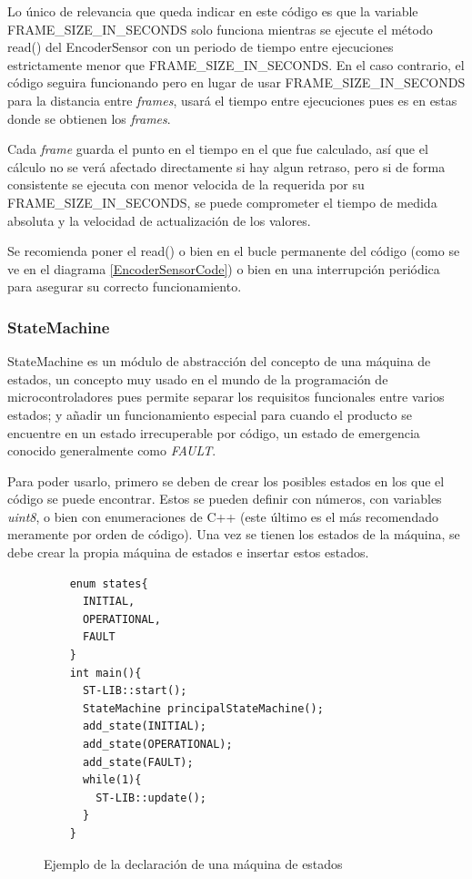 \documentclass{report}
\begin{document}
\par \vspace{0.3cm}
Lo único de relevancia que queda indicar en este código es que la variable FRAME\_SIZE\_IN\_SECONDS solo funciona mientras se ejecute el método read() del EncoderSensor con un periodo de tiempo entre ejecuciones estrictamente menor que FRAME\_SIZE\_IN\_SECONDS. En el caso contrario, el código seguira funcionando pero en lugar de usar FRAME\_SIZE\_IN\_SECONDS para la distancia entre \textit{frames}, usará el tiempo entre ejecuciones pues es en estas donde se obtienen los \textit{frames}. \par
Cada \textit{frame} guarda el punto en el tiempo en el que fue calculado, así que el cálculo no se verá afectado directamente si hay algun retraso, pero si de forma consistente se ejecuta con menor velocida de la requerida por su FRAME\_SIZE\_IN\_SECONDS, se puede comprometer el tiempo de medida absoluta y la velocidad de actualización de los valores. \par \vspace{0.3cm}
Se recomienda poner el read() o bien en el bucle permanente del código (como se ve en el diagrama \ref{EncoderSensorCode}) o bien en una interrupción periódica para asegurar su correcto funcionamiento. 

\subsubsection{StateMachine}
StateMachine es un módulo de abstracción del concepto de una máquina de estados, un concepto muy usado en el mundo de la programación de microcontroladores pues permite separar los requisitos funcionales entre varios estados; y añadir un funcionamiento especial para cuando el producto se encuentre en un estado irrecuperable por código, un estado de emergencia conocido generalmente como 
\textit{FAULT}. \par \vspace{0.3cm}
Para poder usarlo, primero se deben de crear los posibles estados en los que el código se puede encontrar. Estos se pueden definir con números, con variables \textit{uint8}, o bien con enumeraciones de C++ (este último es el más recomendado meramente por orden de código). Una vez se tienen los estados de la máquina, se debe crear la propia máquina de estados e insertar estos estados.
\begin{figure}[h]
  \begin{lstlisting}
    enum states{
      INITIAL,
      OPERATIONAL,
      FAULT
    }
    int main(){
      ST-LIB::start();
      StateMachine principalStateMachine();
      add_state(INITIAL);
      add_state(OPERATIONAL);
      add_state(FAULT);
      while(1){
        ST-LIB::update();
      }
    }
  \end{lstlisting}
  \caption{Ejemplo de la declaración de una máquina de estados}
  \label{StateMachineDefCode}
\end{figure}
\par \vspace{0.3cm}
\end{document}
